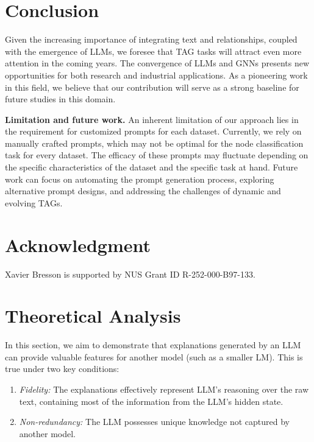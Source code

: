 \documentclass{article}
\begin{document}
\section{Conclusion}
Given the increasing importance of integrating text and relationships, coupled with the emergence of LLMs, we foresee that TAG tasks will attract even more attention in the coming years. The convergence of LLMs and GNNs presents new opportunities for both research and industrial applications. As a pioneering work in this field, we believe that our contribution will serve as a strong baseline for future studies in this domain.


\textbf{Limitation and future work.}
An inherent limitation of our approach lies in the requirement for customized prompts for each dataset. Currently, we rely on manually crafted prompts, which may not be optimal for the node classification task for every dataset. The efficacy of these prompts may fluctuate depending on the specific characteristics of the dataset and the specific task at hand.
Future work can focus on automating the prompt generation process, exploring alternative prompt designs, and addressing the challenges of dynamic and evolving TAGs.


\section*{Acknowledgment}
Xavier Bresson is supported by NUS Grant ID R-252-000-B97-133.

\printbibliography

\newpage
\appendix
\section{Theoretical Analysis}\label{theory}

In this section, we aim to demonstrate that explanations generated by an LLM can provide valuable features for another model (such as a smaller LM). This is true under two key conditions:
\begin{enumerate}
\item \emph{Fidelity:} The explanations effectively represent LLM's reasoning over the raw text, containing most of the information from the LLM's hidden state.
\item \emph{Non-redundancy:} The LLM possesses unique knowledge not captured by another model.
\end{enumerate}
\end{document}
